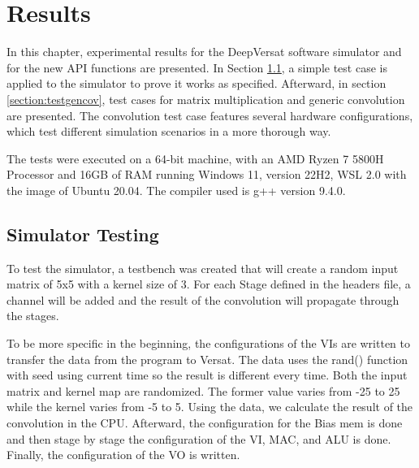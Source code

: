 
\chapter{Results}
\label{chapter:results}

In this chapter, experimental results for the DeepVersat software simulator and
for the new API functions are presented. In Section \ref{section:simtest}, a
simple test case is applied to the simulator to prove it works as
specified. Afterward, in section \ref{section:testgencov}, test cases for matrix
multiplication and generic convolution are presented. The convolution test case
features several hardware configurations, which test different simulation
scenarios in a more thorough way.

The tests were executed on a 64-bit machine, with an AMD Ryzen 7 5800H Processor
and 16GB of RAM running Windows 11, version 22H2, WSL 2.0 with the image of
Ubuntu 20.04. The compiler used is g++ version 9.4.0.


\section{Simulator Testing}
\label{section:simtest}

To test the simulator, a testbench was created that will create a random input matrix of 5x5
with a kernel size of 3. For each Stage defined in the headers file, a channel will be added and
the result of the convolution will propagate through the stages.

To be more specific in the beginning, the configurations of the VIs are written to transfer the data
from the program to Versat. The data uses the rand() function with seed using current time
so the result is different every time. Both the input matrix and kernel map are randomized.
The former value varies from -25 to 25 while the kernel varies from -5 to 5. Using the data, 
we calculate the result of the convolution in the CPU. Afterward, the configuration for the Bias mem
is done and then stage by stage the configuration of the VI, MAC, and ALU is done. Finally, the
configuration of the VO is written.


